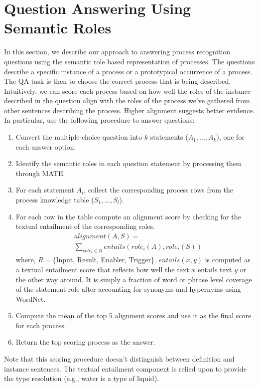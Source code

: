 \section{Question Answering Using Semantic Roles}

In this section, we describe our approach to answering process recognition questions using the semantic role based representation of processes.
The questions describe a specific instance of a process or a prototypical occurrence of a process. 
The QA task is then to choose the correct process that is being described. 
Intuitively, we can score each process based on how well the roles of the instance described in the question align with the roles of the process we've gathered from other sentences describing the process. 
Higher alignment suggests better evidence. 
In particular, use the following procedure to answer questions:\\
\begin{enumerate}
\item Convert the multiple-choice question into $k$ statements (${A_1, ..., A_k}$), one for each answer option. 
\item Identify the semantic roles in each question statement by processing them through MATE. 
\item For each statement $A_i$, collect the corresponding process rows from the process knowledge table ($S_1, ..., S_l$). 
\item For each row in the table compute an alignment score by checking for the textual entailment of the corresponding roles. 
\begin{align*}
&alignment(A, S) = \\
& \sum_{role_i \in R} entails(role_i(A), role_i(S))
\end{align*}
where, $R =$\{Input, Result, Enabler, Trigger\}. $entails(x, y)$ is computed as a textual entailment score that reflects how well the text $x$ entails text $y$ or the other way around. It is simply a fraction of word or phrase level coverage of the statement role after accounting for synonyms and hypernyms using WordNet. 
\item Compute the mean of the top 5 alignment scores and use it as the final score for each process. 
\item Return the top scoring process as the answer.
\end{enumerate}

Note that this scoring procedure doesn't distinguish between definition and instance sentences. 
The textual entailment component is relied upon to provide the type resolution (e.g., water is a type of liquid).




